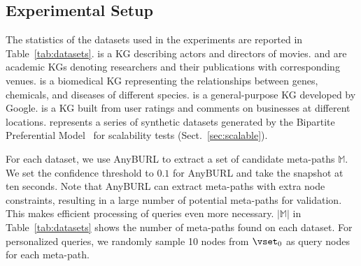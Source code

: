 \subsection{Experimental Setup}

The statistics of the datasets used in the experiments are reported in Table~\ref{tab:datasets}.
\dsimdb is a KG describing actors and directors of movies.
\dsacm and \dsdblp are academic KGs denoting researchers and their publications with corresponding venues.
\dspubmed is a biomedical KG representing the relationships between genes, chemicals, and diseases of different species.
\dsfreebase is a general-purpose KG developed by Google.
\dsyelp is a KG built from user ratings and comments on businesses at different locations.
\dsbpm represents a series of synthetic datasets generated by the Bipartite Preferential Model~\cite{xirogiannopoulos2017extracting,guillaume2004bipartite,guillaume2006bipartite} for scalability tests (Sect.~\ref{sec:scalable}).



\vspace{1mm}
For each dataset, we use \textsf{AnyBURL} \cite{meilicke2019anytime} to extract a set of candidate meta-paths $\mathbb{M}$.
We set the confidence threshold to $0.1$ for \textsf{AnyBURL} and take the snapshot at ten seconds.
Note that \textsf{AnyBURL} can extract meta-paths with extra node constraints, resulting in a large number of potential meta-paths for validation.
This makes efficient processing of \ced queries even more necessary. $|\mathbb{M}|$ in Table~\ref{tab:datasets} shows the number of meta-paths found on each dataset.
For personalized \ced queries, we randomly sample 10 nodes from $\vset_0$ as query nodes for each meta-path.

